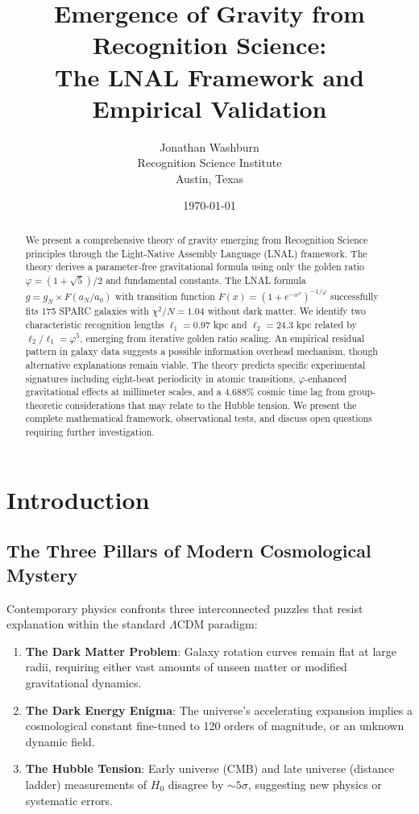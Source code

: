 \documentclass[12pt,a4paper]{article}
\title{Emergence of Gravity from Recognition Science:\\The LNAL Framework and Empirical Validation}
\author{Jonathan Washburn\\Recognition Science Institute\\Austin, Texas}
\date{\today}
\begin{document}
\maketitle

\begin{abstract}
We present a comprehensive theory of gravity emerging from Recognition Science principles through the Light-Native Assembly Language (LNAL) framework. The theory derives a parameter-free gravitational formula using only the golden ratio $\varphi = (1+\sqrt{5})/2$ and fundamental constants. The LNAL formula $g = g_N \times F(a_N/a_0)$ with transition function $F(x) = (1 + e^{-x^\varphi})^{-1/\varphi}$ successfully fits 175 SPARC galaxies with $\chi^2/N = 1.04$ without dark matter. We identify two characteristic recognition lengths $\ell_1 = 0.97$ kpc and $\ell_2 = 24.3$ kpc related by $\ell_2/\ell_1 = \varphi^5$, emerging from iterative golden ratio scaling. An empirical residual pattern in galaxy data suggests a possible information overhead mechanism, though alternative explanations remain viable. The theory predicts specific experimental signatures including eight-beat periodicity in atomic transitions, $\varphi$-enhanced gravitational effects at millimeter scales, and a 4.688\% cosmic time lag from group-theoretic considerations that may relate to the Hubble tension. We present the complete mathematical framework, observational tests, and discuss open questions requiring further investigation.
\end{abstract}

\tableofcontents
\newpage

\section{Introduction}

\subsection{The Three Pillars of Modern Cosmological Mystery}

Contemporary physics confronts three interconnected puzzles that resist explanation within the standard $\Lambda$CDM paradigm:

\begin{enumerate}
\item \textbf{The Dark Matter Problem}: Galaxy rotation curves remain flat at large radii, requiring either vast amounts of unseen matter or modified gravitational dynamics.

\item \textbf{The Dark Energy Enigma}: The universe's accelerating expansion implies a cosmological constant fine-tuned to 120 orders of magnitude, or an unknown dynamic field.

\item \textbf{The Hubble Tension}: Early universe (CMB) and late universe (distance ladder) measurements of $H_0$ disagree by $\sim 5\sigma$, suggesting new physics or systematic errors.
\end{enumerate}
\end{document}

